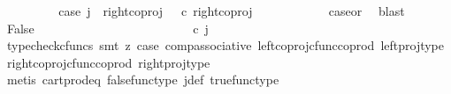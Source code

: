 \begin{isabellebody}
\ \ \ \ \ \ \isamarkupfalse%
\ \isamarkupfalse%
\ case{}{\isacharcolon}{\kern0pt}\ {\isachardoublequoteopen}j\ {\isacharequal}{\kern0pt}\ right{\isacharunderscore}{\kern0pt}coproj\ {\isasymone}\ {\isacharparenleft}{\kern0pt}{\isasymone}{\isasymCoprod}{\isasymone}{\isacharparenright}{\kern0pt}\ {\isasymcirc}\isactrlsub c\ right{\isacharunderscore}{\kern0pt}coproj\ {\isasymone}\ {\isasymone}{\isachardoublequoteclose}\isanewline
\ \ \ \ \ \ \ \ \isamarkupfalse%
\ case{}{\isacharunderscore}{\kern0pt}or{\isacharunderscore}{\kern0pt}{}\ \isamarkupfalse%
\ blast\isanewline
\ \ \ \ \ \ \isamarkupfalse%
\ False\isanewline
\ \ \ \ \ \ \isamarkupfalse%
\ {\isacharminus}{\kern0pt}\ \isanewline
\ \ \ \ \ \ \ \ \isamarkupfalse%
\ {\isachardoublequoteopen}{\isacharparenleft}{\kern0pt}{\isasymlangle}{\isasymt}{\isacharcomma}{\kern0pt}\ {\isasymt}{\isasymrangle}{\isasymamalg}\ {\isacharparenleft}{\kern0pt}{\isasymlangle}{\isasymf}{\isacharcomma}{\kern0pt}\ {\isasymf}{\isasymrangle}\ {\isasymamalg}{\isasymlangle}{\isasymf}{\isacharcomma}{\kern0pt}\ {\isasymt}{\isasymrangle}{\isacharparenright}{\kern0pt}{\isacharparenright}{\kern0pt}\ {\isasymcirc}\isactrlsub c\ j\ {\isacharequal}{\kern0pt}\ {\isasymlangle}{\isasymf}{\isacharcomma}{\kern0pt}\ {\isasymt}{\isasymrangle}{\isachardoublequoteclose}\isanewline
\ \ \ \ \ \ \ \ \ \ \isamarkupfalse%
\ {\isacharparenleft}{\kern0pt}typecheck{\isacharunderscore}{\kern0pt}cfuncs{\isacharcomma}{\kern0pt}\ smt\ {\isacharparenleft}{\kern0pt}z{}{\isacharparenright}{\kern0pt}\ case{}\ comp{\isacharunderscore}{\kern0pt}associative{}\ left{\isacharunderscore}{\kern0pt}coproj{\isacharunderscore}{\kern0pt}cfunc{\isacharunderscore}{\kern0pt}coprod\ left{\isacharunderscore}{\kern0pt}proj{\isacharunderscore}{\kern0pt}type\ right{\isacharunderscore}{\kern0pt}coproj{\isacharunderscore}{\kern0pt}cfunc{\isacharunderscore}{\kern0pt}coprod\ right{\isacharunderscore}{\kern0pt}proj{\isacharunderscore}{\kern0pt}type{\isacharparenright}{\kern0pt}\isanewline
\ \ \ \ \ \ \ \ \isamarkupfalse%
\ \isamarkupfalse%
\ {\isachardoublequoteopen}{\isasymlangle}{\isasymt}{\isacharcomma}{\kern0pt}\ {\isasymt}{\isasymrangle}\ {\isacharequal}{\kern0pt}\ {\isasymlangle}{\isasymf}{\isacharcomma}{\kern0pt}\ {\isasymt}{\isasymrangle}{\isachardoublequoteclose}\isanewline
\ \ \ \ \ \ \ \ \ \ \isamarkupfalse%
\ {\isacharparenleft}{\kern0pt}metis\ cart{\isacharunderscore}{\kern0pt}prod{\isacharunderscore}{\kern0pt}eq{}\ false{\isacharunderscore}{\kern0pt}func{\isacharunderscore}{\kern0pt}type\ j{\isacharunderscore}{\kern0pt}def\ true{\isacharunderscore}{\kern0pt}func{\isacharunderscore}{\kern0pt}type{\isacharparenright}{\kern0pt}\isanewline

\end{isabellebody}
